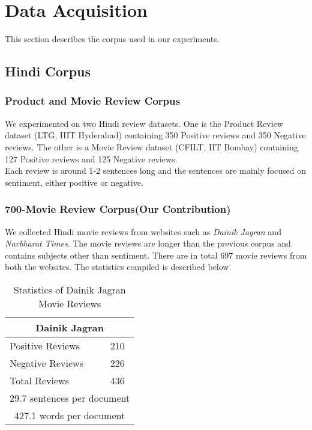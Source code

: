 \chapter{Data Acquisition}
\label{sec:data}
This section describes the corpus used in our experiments.

\section{Hindi Corpus}
\label{hindi_corpus}
\subsection{Product and Movie Review Corpus}
We experimented on two Hindi review datasets. One is the Product Review dataset (LTG, IIIT Hyderabad) containing 350 Positive reviews and 350 Negative reviews. The other is a Movie Review dataset (CFILT, IIT Bombay) containing 127 Positive reviews and 125 Negative reviews.\\
Each review is around 1-2 sentences long and the sentences are mainly focused on sentiment, either positive or negative.

\subsection{700-Movie Review Corpus(Our Contribution)}
\label{new_reviews}
We collected Hindi movie reviews from websites such as \emph{Dainik Jagran} and \emph{Navbharat Times}. The movie reviews are longer than the previous corpus and contains subjects other than sentiment.
There are in total 697 movie reviews from both the websites. The statistics compiled is described below.\\

\begin {table}[h!]
\large
\centering
\begin{tabular}{ |l|l| }
\hline
\multicolumn{2}{|c|}{\textbf{Dainik Jagran}} \\
\hline
Positive Reviews & 210 \\ 
Negative Reviews & 226 \\
Total Reviews & 436\\ \hline
\multicolumn{2}{|c|}{29.7 sentences per document} \\ \hline
\multicolumn{2}{|c|}{427.1 words per document} \\
\hline
\end{tabular}
\caption {Statistics of Dainik Jagran Movie Reviews}
\end{table}


